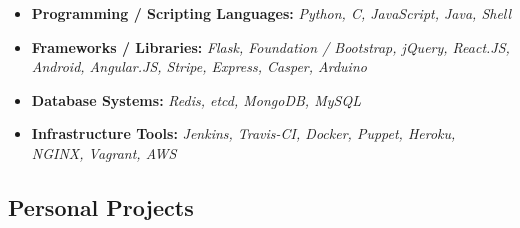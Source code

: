 \documentclass[12pt,a4paper,sans]{moderncv}
\begin{document}
\begin{itemize}
\item{\textbf{Programming / Scripting Languages:} \textit{Python, C, JavaScript, Java, Shell}}
\vspace{3pt}


\item{\textbf{Frameworks / Libraries:}\textit{ Flask, Foundation / Bootstrap, jQuery, React.JS, Android, Angular.JS, Stripe, Express, Casper, Arduino}}
\vspace{3pt}

\item{\textbf{Database Systems:}\textit{ Redis, etcd, MongoDB, MySQL}}
\vspace{3pt}

\item{\textbf{Infrastructure Tools:}\textit{ Jenkins, Travis-CI, Docker, Puppet, Heroku, NGINX, Vagrant, AWS}}
\vspace{3pt}



\iffalse

\item{\textbf{Coursework:}
\textit{ Quantum Mechanics, Quantum Computing, Artificial Intelligence, Algorithms, Operating Systems Design, Systems Programming, Computer Architecture, Electricity and Magnetism, Internet Protocols, Solid State Physics, Database Management Systems, Astrophysics, Discrete Mathematics, Discrete Probability, Data Structures, Web Design.
}}

\fi 

\end{itemize}

\subsection{Personal Projects}
\vspace{5pt}
\end{document}
